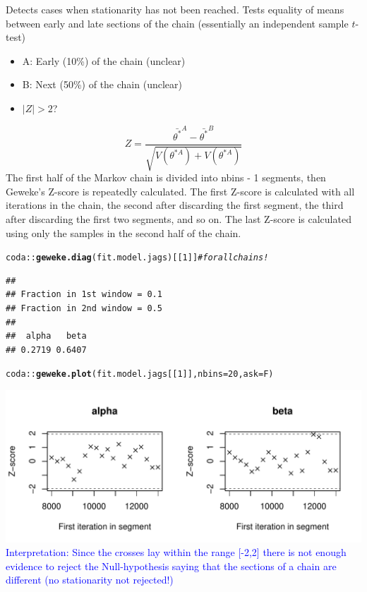 \documentclass{article}\usepackage[]{graphicx}\usepackage[]{xcolor}
\makeatletter
\def\maxwidth{ %
  \ifdim\Gin@nat@width>\linewidth
    \linewidth
  \else
    \Gin@nat@width
  \fi
}
\newcommand{\hlnum}[1]{\textcolor[rgb]{0.686,0.059,0.569}{#1}}%
\newcommand{\hlcom}[1]{\textcolor[rgb]{0.678,0.584,0.686}{\textit{#1}}}%
\newcommand{\hlopt}[1]{\textcolor[rgb]{0,0,0}{#1}}%
\newcommand{\hlstd}[1]{\textcolor[rgb]{0.345,0.345,0.345}{#1}}%
\newcommand{\hlkwc}[1]{\textcolor[rgb]{0.333,0.667,0.333}{#1}}%
\newcommand{\hlkwd}[1]{\textcolor[rgb]{0.737,0.353,0.396}{\textbf{#1}}}%
\newenvironment{kframe}{%
 \def\at@end@of@kframe{}%
 \ifinner\ifhmode%
  \def\at@end@of@kframe{\end{minipage}}%
  \begin{minipage}{\columnwidth}%
 \fi\fi%
 \def\FrameCommand##1{\hskip\@totalleftmargin \hskip-\fboxsep
 \colorbox{shadecolor}{##1}\hskip-\fboxsep
     \hskip-\linewidth \hskip-\@totalleftmargin \hskip\columnwidth}%
 \MakeFramed {\advance\hsize-\width
   \@totalleftmargin\z@ \linewidth\hsize
   \@setminipage}}%
 {\par\unskip\endMakeFramed%
 \at@end@of@kframe}
\newenvironment{knitrout}{}{} %
\makeatother
\begin{document}
\begin{multicols*}{2}
Detects cases when stationarity has not been reached. Tests equality of means between early and late sections of the chain (essentially an independent sample $t$-test)
\begin{itemize}
\item A: Early (10\%) of the chain (unclear)
\item B: Next (50\%) of the chain (unclear)
\item $|Z|>2$?
\end{itemize}
$$
Z=\frac{\bar{\theta^*}^A-\bar{\theta^*}^B}{\sqrt{V(\theta^{*A})+V(\theta^{*A})}}
$$
The first half of the Markov chain is divided into nbins - 1 segments, then Geweke's Z-score is repeatedly calculated. The first Z-score is calculated with all iterations in the chain, the second after discarding the first segment, the third after discarding the first two segments, and so on. The last Z-score is calculated using only the samples in the second half of the chain.
\tiny
\begin{knitrout}
\color{fgcolor}\begin{kframe}
\begin{alltt}
\hlstd{coda}\hlopt{::}\hlkwd{geweke.diag}\hlstd{(fit.model.jags)[[}\hlnum{1}\hlstd{]]}\hlcom{#for all chains!}
\end{alltt}
\begin{verbatim}
## 
## Fraction in 1st window = 0.1
## Fraction in 2nd window = 0.5 
## 
##  alpha   beta 
## 0.2719 0.6407
\end{verbatim}
\begin{alltt}
\hlstd{coda}\hlopt{::}\hlkwd{geweke.plot}\hlstd{(fit.model.jags[[}\hlnum{1}\hlstd{]],}\hlkwc{nbins} \hlstd{=} \hlnum{20}\hlstd{,} \hlkwc{ask} \hlstd{=F)}
\end{alltt}
\end{kframe}
\includegraphics[width=\maxwidth]{figure/geweke-1} 
\end{knitrout}
\footnotesize
\textcolor{blue}{Interpretation: Since the crosses lay within the range [-2,2] there is not enough evidence to reject the Null-hypothesis saying that the sections of a chain are different (no stationarity not rejected!)}


\end{multicols*}
\end{document}

